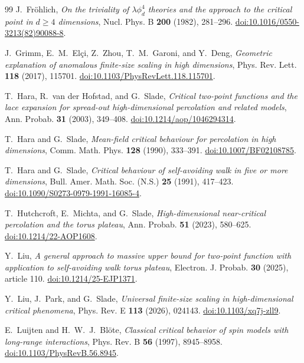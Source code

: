 \documentclass[11pt]{article}
\theoremstyle{definition}
\begin{document}
\begin{thebibliography}{99}
J.~Fr\"ohlich, \emph{On the triviality of $\lambda\phi_d^4$ theories and
the approach to the critical point in $d\geq4$ dimensions},
Nucl. Phys. B \textbf{200} (1982), 281--296.
\href{https://doi.org/10.1016/0550-3213(82)90088-8}{doi:10.1016/0550-3213(82)90088-8}.

J.~Grimm, E.~M.~El\c{c}i, Z.~Zhou, T.~M.~Garoni, and Y.~Deng,
\emph{Geometric explanation of anomalous finite-size scaling in high
dimensions}, Phys. Rev. Lett. \textbf{118} (2017), 115701.
\href{https://doi.org/10.1103/PhysRevLett.118.115701}{doi:10.1103/PhysRevLett.118.115701}.

T.~Hara, R.~van der Hofstad, and G.~Slade,
\emph{Critical two-point functions and the lace expansion for spread-out
high-dimensional percolation and related models}, Ann. Probab.
\textbf{31} (2003), 349--408.
\href{https://doi.org/10.1214/aop/1046294314}{doi:10.1214/aop/1046294314}.

T.~Hara and G.~Slade, \emph{Mean-field critical behaviour for percolation
in high dimensions}, Comm. Math. Phys. \textbf{128} (1990), 333--391.
\href{https://doi.org/10.1007/BF02108785}{doi:10.1007/BF02108785}.

T.~Hara and G.~Slade, \emph{Critical behaviour of self-avoiding walk in
five or more dimensions}, Bull. Amer. Math. Soc. (N.S.) \textbf{25}
(1991), 417--423.
\href{https://doi.org/10.1090/S0273-0979-1991-16085-4}{doi:10.1090/S0273-0979-1991-16085-4}.

T.~Hutchcroft, E.~Michta, and G.~Slade,
\emph{High-dimensional near-critical percolation and the torus plateau},
Ann. Probab. \textbf{51} (2023), 580--625.
\href{https://doi.org/10.1214/22-AOP1608}{doi:10.1214/22-AOP1608}.

Y.~Liu, \emph{A general approach to massive upper bound for two-point
function with application to self-avoiding walk torus plateau},
Electron. J. Probab. \textbf{30} (2025), article 110.
\href{https://doi.org/10.1214/25-EJP1371}{doi:10.1214/25-EJP1371}.

Y.~Liu, J.~Park, and G.~Slade,
\emph{Universal finite-size scaling in high-dimensional critical phenomena},
Phys. Rev. E \textbf{113} (2026), 024143.
\href{https://doi.org/10.1103/xq7j-zll9}{doi:10.1103/xq7j-zll9}.

E.~Luijten and H.~W.~J.~Bl\"ote, \emph{Classical critical behavior of spin
models with long-range interactions}, Phys. Rev. B \textbf{56} (1997),
8945--8958.
\href{https://doi.org/10.1103/PhysRevB.56.8945}{doi:10.1103/PhysRevB.56.8945}.


\end{thebibliography}
\end{document}

